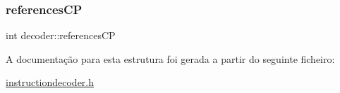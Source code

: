 \hypertarget{struct_mapper_af2d2cc85289235cb8ba33cb807404241}{}\label{struct_mapper_af2d2cc85289235cb8ba33cb807404241} 
\subsubsection{\texorpdfstring{references\+CP}{referencesCP}}
{\footnotesize\ttfamily int decoder\+::references\+CP}



A documentação para esta estrutura foi gerada a partir do seguinte ficheiro\+:\begin{DoxyCompactItemize}
\item 
\hyperlink{instruction_mapper_8h}{instruction\+decoder.\+h}\end{DoxyCompactItemize}
